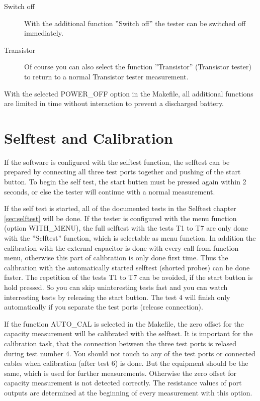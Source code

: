 \begin{description}
\item[Switch off]
With the additional function ''Switch off'' the tester can be switched off immediately.\\

\item[Transistor]
Of course you can also select the function ''Transistor'' (Transistor tester) to return to a normal Transistor tester measurement. 
\end{description}

With the selected POWER\_OFF option in the Makefile, all additional functions are limited in time without interaction to prevent a discharged battery.


\section{Selftest and Calibration}

If the software is configured with the selftest function, the selftest can be prepared by connecting all three
test ports together and pushing of the start button.
To begin the self test, the start butten must be pressed again within 2 seconds, or else the tester will continue
with a normal measurement.

If the self test is started, all of the documented tests in the Selftest chapter \ref{sec:selftest} will be done.
If the tester is configured with the menu function (option WITH\_MENU), 
the full selftest with the tests T1 to T7 are only done with the ''Selftest'' function, 
which is selectable as menu function.
In addition the calibration with the external capacitor is done with every call from function menu,
otherwise this part of calibration is only done first time.
Thus the calibration with the automatically started selftest (shorted probes) can be done faster.
The repetition of the tests T1 to T7 can be avoided, if the start button is hold pressed.
So you can skip uninteresting tests fast and you can watch interresting tests by releasing the start button.
The test 4 will finish only automatically if you separate the test ports (release connection).

If the function AUTO\_CAL is selected in the Makefile, 
the zero offset for the capacity measurement will be calibrated with the selftest.
It is important for the calibration task, that the connection between the three test ports is relased 
during test number 4. 
You should not touch to any of the test ports or connected cables when calibration (after test 6) is done.
But the equipment should be the same, which is used for further measurements.
Otherwise the zero offset for capacity measurement is not detected correctly.
The resistance values of port outputs are determined at the beginning of every measurement with this option.

